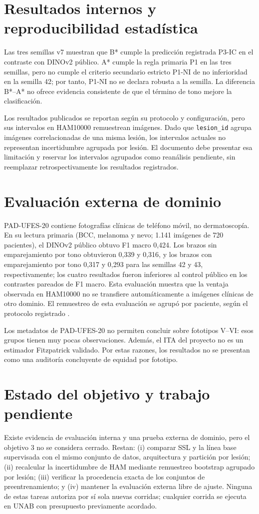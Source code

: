 \section{Resultados internos y reproducibilidad estadística}

Las tres semillas v7 muestran que B* cumple la predicción registrada P3-IC en el contraste con DINOv2 público. A* cumple la regla primaria P1 en las tres semillas, pero no cumple el criterio secundario estricto P1-NI de no inferioridad en la semilla 42; por tanto, P1-NI no se declara robusta a la semilla. La diferencia B*--A* no ofrece evidencia consistente de que el término de tono mejore la clasificación.

Los resultados publicados se reportan según su protocolo y configuración, pero sus intervalos en HAM10000 remuestrean imágenes. Dado que \texttt{lesion\_id} agrupa imágenes correlacionadas de una misma lesión, los intervalos actuales no representan incertidumbre agrupada por lesión. El documento debe presentar esa limitación y reservar los intervalos agrupados como reanálisis pendiente, sin reemplazar retrospectivamente los resultados registrados.

\section{Evaluación externa de dominio}

PAD-UFES-20 contiene fotografías clínicas de teléfono móvil, no dermatoscopía. En su lectura primaria (BCC, melanoma y nevo; 1.141 imágenes de 720 pacientes), el DINOv2 público obtuvo F1 macro 0,424. Los brazos sin emparejamiento por tono obtuvieron 0,339 y 0,316, y los brazos con emparejamiento por tono 0,317 y 0,293 para las semillas 42 y 43, respectivamente; los cuatro resultados fueron inferiores al control público en los contrastes pareados de F1 macro. Esta evaluación muestra que la ventaja observada en HAM10000 no se transfiere automáticamente a imágenes clínicas de otro dominio. El remuestreo de esta evaluación se agrupó por paciente, según el protocolo registrado \parencite{pacheco2020padufes}.

Los metadatos de PAD-UFES-20 no permiten concluir sobre fototipos V--VI: esos grupos tienen muy pocas observaciones. Además, el ITA del proyecto no es un estimador Fitzpatrick validado. Por estas razones, los resultados no se presentan como una auditoría concluyente de equidad por fototipo.

\section{Estado del objetivo y trabajo pendiente}

Existe evidencia de evaluación interna y una prueba externa de dominio, pero el objetivo 3 no se considera cerrado. Restan: (i) comparar SSL y la línea base supervisada con el mismo conjunto de datos, arquitectura y partición por lesión; (ii) recalcular la incertidumbre de HAM mediante remuestreo bootstrap agrupado por lesión; (iii) verificar la procedencia exacta de los conjuntos de preentrenamiento; y (iv) mantener la evaluación externa libre de ajuste. Ninguna de estas tareas autoriza por sí sola nuevas corridas; cualquier corrida se ejecuta en UNAB con presupuesto previamente acordado.
